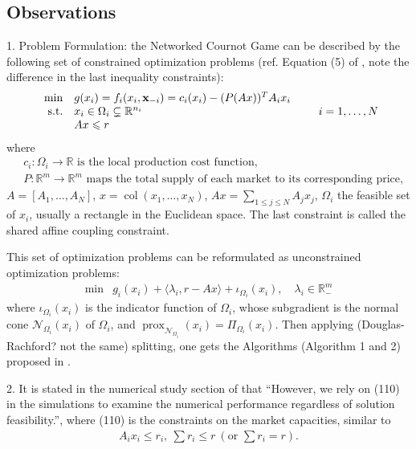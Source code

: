 
\subsection*{Observations}

1. Problem Formulation: the Networked Cournot Game can be described by the following set of constrained optimization problems (ref. Equation (5) of \citep{Yi_2019}, note the difference in the last inequality constraints):
\begin{equation}
\label{eq:original_problem}
\def\arraystretch{1}
\begin{array}{rl}
\min & g(x_i) = f_i(x_i, \mathbf{x}_{-i}) = c_i(x_i) - (P(Ax))^TA_ix_i \\
\text{s.t.} & x_i \in \Omega_i \subsetneq \mathbb{R}^{n_i} \\
& Ax \leqslant r
\end{array}
\qquad i = 1, \ldots, N
\end{equation}
where
\begin{align*}
& c_i: \Omega_i \to \mathbb{R} \text{ is the local production cost function,} \\
& P: \mathbb{R}^m \to \mathbb{R}^m \text{ maps the total supply of each market to its corresponding price,}
\end{align*}
$A = [A_1, \ldots, A_N]$, $x = \operatorname{col}(x_1, \ldots, x_N)$, $Ax = \sum\limits_{1 \leqslant j \leqslant N} A_jx_j$, $\Omega_i$ the feasible set of $x_i$, usually a rectangle in the Euclidean space. The last constraint is called the shared affine coupling constraint.

This set of optimization problems can be reformulated as unconstrained optimization problems:
\begin{equation}
\label{eq:reformulated_problem}
\begin{array}{rl}
\min & g_i(x_i) + \langle \lambda_i, r-Ax \rangle + \iota_{\Omega_i} (x_i), \quad \lambda_i \in \mathbb{R}_-^m
\end{array}
\end{equation}
where $\iota_{\Omega_i} (x_i)$ is the indicator function of $\Omega_i$, whose subgradient is the normal cone $\mathcal{N}_{\Omega_i} (x_i)$ of $\Omega_i$, and $\operatorname{prox}_{\mathcal{N}_{\Omega_i}}(x_i) = \Pi_{\Omega_i}(x_i)$. Then applying (Douglas-Rachford? not the same) splitting, one gets the Algorithms (Algorithm 1 and 2) proposed in \citep{Yi_2019}.


2. It is stated in the numerical study section of \citep{Yu_2017} that ``\textcolor{red!60}{However, we rely on (110) in the simulations to examine the numerical performance regardless of solution feasibility.}'', where (110) is the constraints on the market capacities, similar to
\begin{align*}
A_i x_i \leqslant r_i, ~ \sum r_i \leqslant r ~ (\text{or } \sum r_i = r).
\end{align*}

